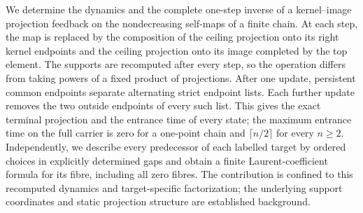 We determine the dynamics and the complete one-step inverse of a
kernel--image projection feedback on the nondecreasing self-maps of a
finite chain. At each step, the map is replaced by the composition of
the ceiling projection onto its right kernel endpoints and the ceiling
projection onto its image completed by the top element. The supports
are recomputed after every step, so the operation differs from taking
powers of a fixed product of projections. After one update, persistent
common endpoints separate alternating strict endpoint lists. Each further
update removes the two outside endpoints of every such list. This gives
the exact terminal projection and the entrance time of every state; the
maximum entrance time on the full carrier is zero for a one-point chain
and $\lceil n/2\rceil$ for every $n\ge2$. Independently, we describe every
predecessor of each labelled target by ordered choices in explicitly
determined gaps and obtain a finite Laurent-coefficient formula for its
fibre, including all zero fibres. The contribution is confined to this
recomputed dynamics and target-specific factorization; the underlying
support coordinates and static projection structure are established
background.
